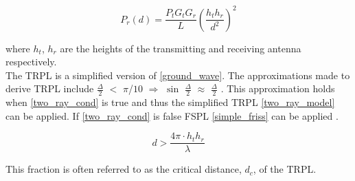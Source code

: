 \begin{equation}
P_r(d) = \frac{P_t G_t G_r }{L}\left(\frac{h_t h_r}{d^2}\right)^2
\label{two_ray_model}
\end{equation}

where $h_t$, $h_r$ are the heights of the transmitting and receiving antenna respectively. \\
The TRPL is a simplified version of \eqref{ground_wave}. The approximations made to derive TRPL include $\frac{\Delta}{2}$ $<$ $\pi$/$10$ $\Rightarrow$ $\sin$ $\frac{\Delta}{2}$ $\approx$ $\frac{\Delta}{2}$ \cite{Chong}. This approximation holds when \eqref{two_ray_cond} is true and thus the simplified TRPL \eqref{two_ray_model} can be applied. If \eqref{two_ray_cond} is false FSPL \eqref{simple_friss} can be applied \cite{two_ray}.
  
\begin{equation}
d > \frac{4\pi \cdot h_t h_r }{\lambda}
\label{two_ray_cond}
\end{equation}

This fraction is often referred to as the critical distance, $d_c$, of the TRPL. 









